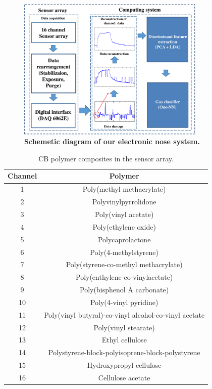 \documentclass[10pt,letterpaper]{article}
\begin{document}
\begin{figure}[h]
	\centering
    \includegraphics[width=0.8\textwidth]{_5.eps}
    \caption{\bf{Schemetic diagram of our electronic nose system.}\label{Fig. 5}}
\end{figure}


\begin{table}[h]
\centering
\caption{CB polymer composites in the sensor array.}
\label{table1}
\begin{tabular}{|c|c|}
\hline
Channel & Polymer                                               \\ \hline
1       & Poly(methyl methacrylate)                             \\ \hline
2       & Polyvinylpyrrolidone                                  \\ \hline
3       & Poly(vinyl acetate)                                   \\ \hline
4       & Poly(ethylene oxide)                                  \\ \hline
5       & Polycaprolactone                                      \\ \hline
6       & Poly(4-methylstyrene)                                 \\ \hline
7       & Poly(styrene-co-methyl methacrylate)                  \\ \hline
8       & Poly(enthylene-co-vinylacetate)                       \\ \hline
9       & Poly(bisphenol A carbonate)                           \\ \hline
10      & Poly(4-vinyl pyridine)                                \\ \hline
11      & Poly(vinyl butyral)-co-vinyl alcohol-co-vinyl acetate \\ \hline
12      & Poly(vinyl stearate)                                  \\ \hline
13      & Ethyl cellulose                                       \\ \hline
14      & Polystyrene-block-polyisoprene-block-polystyrene      \\ \hline
15      & Hydroxypropyl cellulose                               \\ \hline
16      & Cellulose acetate                                     \\ \hline
\end{tabular}
\end{table}
\end{document}
